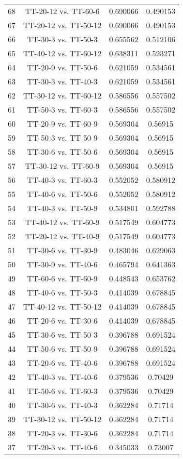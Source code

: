 \documentclass[a4paper,10pt]{article}
\begin{document}
\begin{landscape}
\begin{table}[!htp]
\begin{tabular}{cccc}
68&TT-20-12 vs. TT-60-6&0.690066&0.490153\\
67&TT-20-12 vs. TT-50-12&0.690066&0.490153\\
66&TT-30-3 vs. TT-50-3&0.655562&0.512106\\
65&TT-40-12 vs. TT-60-12&0.638311&0.523271\\
64&TT-20-9 vs. TT-50-6&0.621059&0.534561\\
63&TT-30-3 vs. TT-40-3&0.621059&0.534561\\
62&TT-30-12 vs. TT-60-12&0.586556&0.557502\\
61&TT-50-3 vs. TT-60-3&0.586556&0.557502\\
60&TT-20-9 vs. TT-60-9&0.569304&0.56915\\
59&TT-50-3 vs. TT-50-9&0.569304&0.56915\\
58&TT-30-6 vs. TT-50-6&0.569304&0.56915\\
57&TT-30-12 vs. TT-60-9&0.569304&0.56915\\
56&TT-40-3 vs. TT-60-3&0.552052&0.580912\\
55&TT-40-6 vs. TT-50-6&0.552052&0.580912\\
54&TT-40-3 vs. TT-50-9&0.534801&0.592788\\
53&TT-40-12 vs. TT-60-9&0.517549&0.604773\\
52&TT-20-12 vs. TT-40-9&0.517549&0.604773\\
51&TT-30-6 vs. TT-30-9&0.483046&0.629063\\
50&TT-30-9 vs. TT-40-6&0.465794&0.641363\\
49&TT-60-6 vs. TT-60-9&0.448543&0.653762\\
48&TT-40-6 vs. TT-50-3&0.414039&0.678845\\
47&TT-40-12 vs. TT-50-12&0.414039&0.678845\\
46&TT-20-6 vs. TT-30-6&0.414039&0.678845\\
45&TT-30-6 vs. TT-50-3&0.396788&0.691524\\
44&TT-50-6 vs. TT-50-9&0.396788&0.691524\\
43&TT-20-6 vs. TT-40-6&0.396788&0.691524\\
42&TT-40-3 vs. TT-40-6&0.379536&0.70429\\
41&TT-50-6 vs. TT-60-3&0.379536&0.70429\\
40&TT-30-6 vs. TT-40-3&0.362284&0.71714\\
39&TT-30-12 vs. TT-50-12&0.362284&0.71714\\
38&TT-20-3 vs. TT-30-6&0.362284&0.71714\\
37&TT-20-3 vs. TT-40-6&0.345033&0.73007\\

\end{tabular}
\end{table}
\end{landscape}
\end{document}
